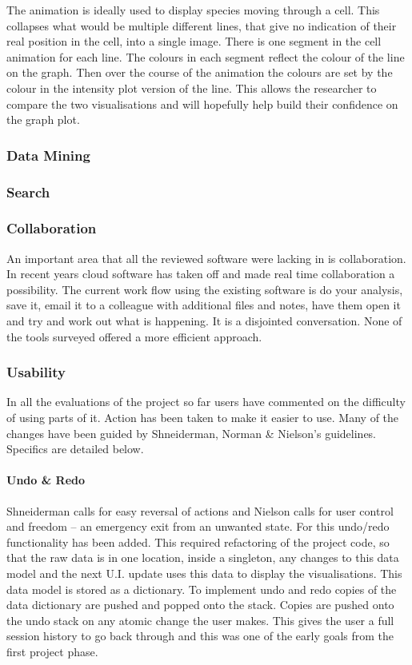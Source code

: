 The animation is ideally used to display species moving through a cell.  This collapses what would be multiple different lines, that give no indication of their real position in the cell, into a single image.  There is one segment in the cell animation for each line.  The colours in each segment reflect the colour of the line on the graph.  Then over the course of the animation the colours are set by the colour in the intensity plot version of the line.  This allows the researcher to compare the two visualisations and will hopefully help build their confidence on the graph plot.

\subsubsection{Data Mining}

\subsubsection{Search}

\subsubsection{Collaboration}

An important area that all the reviewed software were lacking in is collaboration.  In recent years cloud software has taken off and made real time collaboration a possibility.  The current work flow using the existing software is do your analysis, save it, email it to a colleague with additional files and notes, have them open it and try and work out what is happening.  It is a disjointed conversation.  None of the tools surveyed offered a more efficient approach.

\subsubsection{Usability}

In all the evaluations of the project so far users have commented on the difficulty of using parts of it.  Action has been taken to make it easier to use.  Many of the changes have been guided by Shneiderman, Norman \& Nielson's guidelines.  Specifics are detailed below.

\paragraph{Undo \& Redo}
Shneiderman calls for easy reversal of actions and Nielson calls for user control and freedom -- an emergency exit from an unwanted state.  For this undo/redo functionality has been added.  This required refactoring of the project code, so that the raw data is in one location, inside a singleton, any changes to this data model and the next U.I. update uses this data to display the visualisations.  This data model is stored as a dictionary.  To implement undo and redo copies of the data dictionary are pushed and popped onto the stack.  Copies are pushed onto the undo stack on any atomic change the user makes.  This gives the user a full session history to go back through and this was one of the early goals from the first project phase.

